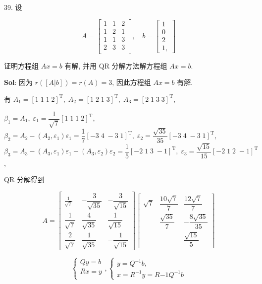 39. 设

$$
A=\begin{bmatrix}
    1&1&2\\
    1&2&1\\
    1&1&3\\
    2&3&3\\
\end{bmatrix},\quad
b=\begin{bmatrix}
    1\\0\\2\\1,
\end{bmatrix}
$$

证明方程组 $Ax=b$ 有解, 并用 $\text{QR}$ 分解方法解方程组 $Ax=b$.

\textbf{Sol}:  因为 $r([A|b])=r(A)=3$, 因此方程组 $Ax=b$ 有解.

有 $A_1=[1\;1\;1\;2]^{\text{T}},\;A_2=[1\;2\;1\;3]^{\text{T}},\;A_3=[2\;1\;3\;3]^{\text{T}}$,

$\beta_1=A_1,\;\varepsilon_1=\dfrac{1}{\sqrt{7}}[1\;1\;1\;2]^{\text{T}}$,
$\beta_2=A_2-(A_2,\varepsilon_1)\varepsilon_1=\dfrac{1}{7}[-3\;4\;-3\;1]^{\text{T}},\;\varepsilon_2=\dfrac{\sqrt{35}}{35}[-3\;4\;-3\;1]^{\text{T}}$, $\beta_3=A_3-(A_3,\varepsilon_1)\varepsilon_1-(A_3,\varepsilon_2)\varepsilon_2=\dfrac{1}{5}[-2\;1\;3\;-1]^{\text{T}},\;\varepsilon_3=\dfrac{\sqrt{15}}{15}[-2\;1\;2\;-1]^{\text{T}}$,

QR 分解得到

$$
A=\begin{bmatrix}
    \frac{1}{\sqrt{7}}&-\dfrac{3}{\sqrt{35}}&-\dfrac{3}{\sqrt{15}}\\
    \dfrac{1}{\sqrt{7}}&\dfrac{4}{\sqrt{35}}&\dfrac{1}{\sqrt{15}}\\
    \dfrac{2}{\sqrt{7}}&\dfrac{1}{\sqrt{35}}&-\dfrac{1}{\sqrt{15}}
\end{bmatrix}\begin{bmatrix}
    \sqrt{7}&\dfrac{10\sqrt{7}}{7}&\dfrac{12\sqrt{7}}{7}\\
    &\dfrac{\sqrt{35}}{7}&-\dfrac{8\sqrt{35}}{35}\\
    &&\dfrac{\sqrt{15}}{5}
\end{bmatrix}
$$

$$
\begin{cases}
    Qy=b\\
    Rx=y\\
\end{cases},
\begin{cases}
    y=Q^{-1}b,\\
    x=R^{-1}y=R{-1}Q^{-1}b
\end{cases}
$$

